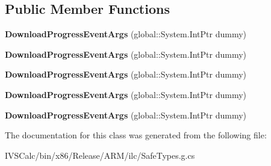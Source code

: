 \subsection*{Public Member Functions}
\begin{DoxyCompactItemize}
\item 
\mbox{\label{class_windows_1_1_u_i_1_1_xaml_1_1_media_1_1_imaging_1_1_download_progress_event_args_ae617782b90002a89e6f3411f8008339f}} 
{\bfseries Download\+Progress\+Event\+Args} (global\+::\+System.\+Int\+Ptr dummy)
\item 
\mbox{\label{class_windows_1_1_u_i_1_1_xaml_1_1_media_1_1_imaging_1_1_download_progress_event_args_ae617782b90002a89e6f3411f8008339f}} 
{\bfseries Download\+Progress\+Event\+Args} (global\+::\+System.\+Int\+Ptr dummy)
\item 
\mbox{\label{class_windows_1_1_u_i_1_1_xaml_1_1_media_1_1_imaging_1_1_download_progress_event_args_ae617782b90002a89e6f3411f8008339f}} 
{\bfseries Download\+Progress\+Event\+Args} (global\+::\+System.\+Int\+Ptr dummy)
\item 
\mbox{\label{class_windows_1_1_u_i_1_1_xaml_1_1_media_1_1_imaging_1_1_download_progress_event_args_ae617782b90002a89e6f3411f8008339f}} 
{\bfseries Download\+Progress\+Event\+Args} (global\+::\+System.\+Int\+Ptr dummy)
\item 
\mbox{\label{class_windows_1_1_u_i_1_1_xaml_1_1_media_1_1_imaging_1_1_download_progress_event_args_ae617782b90002a89e6f3411f8008339f}} 
{\bfseries Download\+Progress\+Event\+Args} (global\+::\+System.\+Int\+Ptr dummy)
\end{DoxyCompactItemize}


The documentation for this class was generated from the following file\+:\begin{DoxyCompactItemize}
\item 
I\+V\+S\+Calc/bin/x86/\+Release/\+A\+R\+M/ilc/Safe\+Types.\+g.\+cs\end{DoxyCompactItemize}
